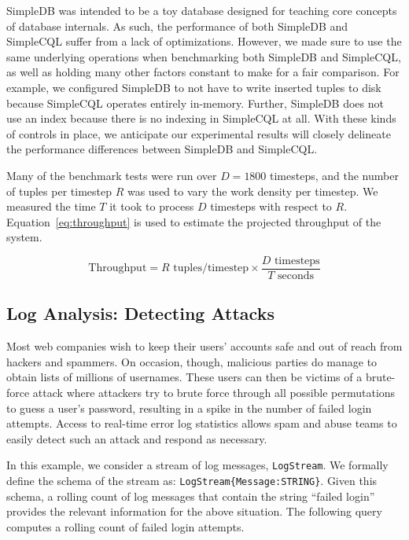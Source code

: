 \documentclass[a4paper, 10pt, conference]{IEEEconf}
\begin{document}
SimpleDB was intended to be a toy database designed for teaching core concepts of database internals.  As such, the performance of both SimpleDB and SimpleCQL suffer from a lack of optimizations.  However, we made sure to use the same underlying operations when benchmarking both SimpleDB and SimpleCQL, as well as holding many other factors constant to make for a fair comparison. For example, we configured SimpleDB to not have to write inserted tuples to disk because SimpleCQL operates entirely in-memory. Further, SimpleDB does not use an index because there is no indexing in SimpleCQL at all. With these kinds of controls in place, we anticipate our experimental results will closely delineate the performance differences between SimpleDB and SimpleCQL.

Many of the benchmark tests were run over $D = 1800$ timesteps, and the number of tuples per timestep $R$ was used to vary the work density per timestep.  We measured the time $T$ it took to process $D$ timesteps with respect to $R$.  Equation~\ref{eq:throughput} is used to estimate the projected throughput of the system.

\begin{equation} \label{eq:throughput}
    \text{Throughput} = R \text{ tuples/timestep} \times \dfrac{D \text{ timesteps}}{T \text{ seconds}}
\end{equation}

\subsection{Log Analysis: Detecting Attacks}
Most web companies wish to keep their users' accounts safe and out of reach from hackers and spammers.  On occasion, though, malicious parties do manage to obtain lists of millions of usernames.  These users can then be victims of a brute-force attack where attackers try to brute force through all possible permutations to guess a user's password, resulting in a spike in the number of failed login attempts. Access to real-time error log statistics allows spam and abuse teams to easily detect such an attack and respond as necessary.

In this example, we consider a stream of log messages, \texttt{LogStream}. We formally define the schema of the stream as: \texttt{LogStream\{Message:STRING\}}. Given this schema, a rolling count of log messages that contain the string ``failed login'' provides the relevant information for the above situation.  The following query computes a rolling count of failed login attempts.
\end{document}
